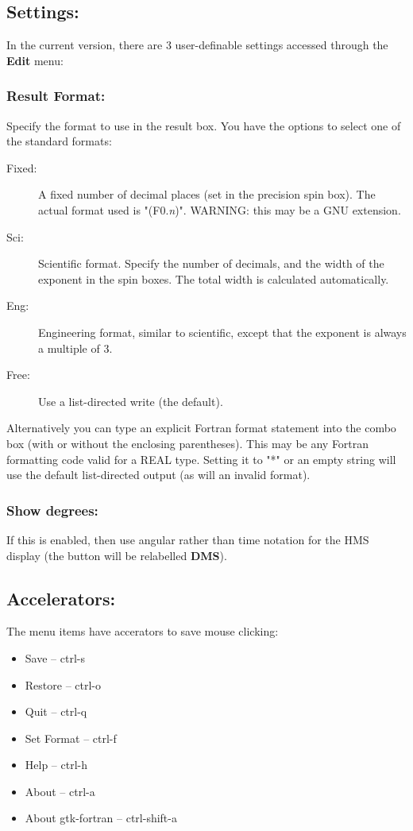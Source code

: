 \documentclass{article}
\begin{document}
  \subsection{Settings:}

  In the current version, there are 3 user-definable settings accessed
  through the \textbf{Edit} menu:

\subsubsection{Result Format:}
Specify the format to use in the result box. You have the options to
select one of the standard formats:
\begin{description}
\item [Fixed:] A fixed number of decimal places (set in the precision
  spin box). The actual format used is "(F0.\emph{n})". WARNING: this
  may be a GNU extension.
\item[Sci:] Scientific format. Specify the number of decimals, and the
  width of the exponent in the spin boxes. The total width is
  calculated automatically.
\item[Eng:] Engineering format, similar to scientific, except that the
  exponent is always a multiple of 3.
\item[Free:] Use a list-directed write (the default).
\end{description}
Alternatively you can type an explicit Fortran format statement into
the combo box (with or without the enclosing parentheses). This may be
any Fortran formatting code valid for a REAL type. Setting it to "*" or
an empty string will use the default list-directed output (as will an
invalid format).

\subsubsection{Show degrees:}
If this is enabled, then use angular rather than time notation for the
HMS display (the button will be relabelled \textbf{DMS}).

\subsection{Accelerators:}

The menu items have accerators to save mouse clicking:

\begin{itemize}
\item Save -- ctrl-s
\item Restore -- ctrl-o
\item Quit -- ctrl-q
\item Set Format -- ctrl-f
\item Help -- ctrl-h
\item About -- ctrl-a
\item About gtk-fortran -- ctrl-shift-a
\end{itemize}
\end{document}
